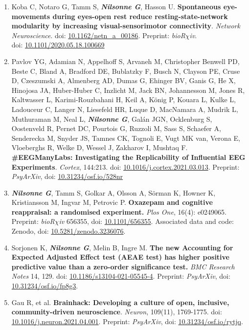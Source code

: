 \documentclass[10pt]{article}
\begin{document}
\begin{enumerate}[nolistsep]
\item Koba C, Notaro G, Tamm S, \textbf{\textit{Nilsonne G}}, Hasson U. \textbf{Spontaneous eye-movements during eyes-open rest reduce resting-state-network modularity by increasing visual-sensorimotor connectivity}. \emph{Network Neuroscience}. doi: \href{https://doi.org/10.1162/netn\_a\_00186}{10.1162/netn\_a\_00186}. Preprint: \emph{bioR$\chi$iv}.\\ doi: \href{https://doi.org/10.1101/2020.05.18.100669}{10.1101/2020.05.18.100669}
\item Pavlov YG, Adamian N, Appelhoff S, Arvaneh M, Christopher Benwell PD, Beste C, Bland A, Bradford DE, Bublatzky F, Busch N, Clayson PE, Cruse D, Czeszumski A, Almenberg AD, Dumas G, Ehinger BV, Ganis G, He X, Hinojosa JA, Huber-Huber C, Inzlicht M, Jack BN, Johannesson M, Jones R, Kaltwasser L, Karimi-Rouzbahani H, Keil A, König P, Kouara L, Kulke L, Ladouceur C, Langer N, Liesefeld HR, Luque D, MacNamara A, Mudrik L, Muthuraman M, Neal L, \textbf{\textit{Nilsonne G}}, Galán JGN, Ocklenburg S, Oostenveld R, Pernet DC, Pourtois G, Ruzzoli M, Sass S, Schaefer A, Senderecka M, Snyder JS, Tamnes CK, Tognoli E, Vugt MK van, Verona E, Vloeberghs R, Welke D, Wessel J, Zakharov I, Mushtaq F. \textbf{\#EEGManyLabs: Investigating the Replicability of Influential EEG Experiments}. \emph{Cortex}, 144:213. doi: \href{https://doi.org/10.1016/j.cortex.2021.03.013}{10.1016/j.cortex.2021.03.013}. Preprint: \emph{PsyArXiv}, doi: \href{https://doi.org/10.31234/osf.io/528nr}{10.31234/osf.io/528nr}
\item \textbf{\textit{Nilsonne G}}, Tamm S, Golkar A, Olsson A, Sörman K, Howner K, Kristiansson M, Ingvar M, Petrovic P. \textbf{Oxazepam and cognitive reappraisal: a randomised experiment.} \emph{Plos One}, 16(4): e0249065. Preprint: \emph{bioR$\chi$iv} 656355, doi: \href{https://doi.org/10.1101/656355}{10.1101/656355}. Associated data and code: Zenodo, doi: \href{https://doi.org/10.5281/zenodo.3236076}{10.5281/zenodo.3236076}.
\item Sorjonen K, \textbf{\textit{Nilsonne G}}, Melin B, Ingre M. \textbf{The new Accounting for Expected Adjusted Effect test (AEAE test) has higher positive predictive value than a zero-order significance test.} \emph{BMC Research Notes} 14, 129. doi: \href{http://doi.org/10.1186/s13104-021-05545-4}{10.1186/s13104-021-05545-4}. Preprint: \emph{PsyArXiv}, doi: \href{http://doi.org/10.31234/osf.io/fp8g3}{10.31234/osf.io/fp8g3}.
\item Gau R, et al. \textbf{Brainhack: Developing a culture of open, inclusive, community-driven neuroscience}. \emph{Neuron}, 109(11), 1769-‌1775. doi: \href{http://doi.org/10.1016/j.neuron.2021.04.001}{10.1016/j.neuron.2021.04.001}. Preprint: \emph{PsyArXiv}, doi: \href{http://doi.org/10.31234/osf.io/rytjq}{10.31234/osf.io/rytjq}.

\end{enumerate}
\end{document}
